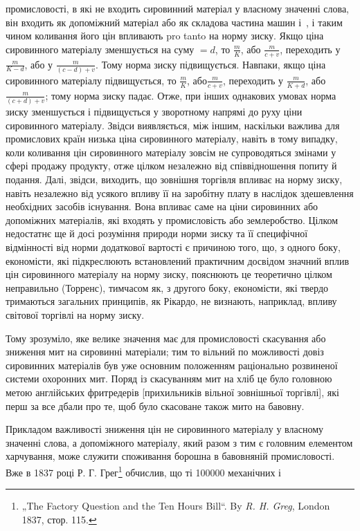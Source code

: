 \parcont{}  %
промисловості, в які не входить сировинний матеріал у власному значенні слова, він входить як
допоміжний матеріал або як складова частина машин і~, і таким чином коливання його цін
впливають pro tanto на норму зиску. Якщо ціна сировинного матеріалу зменшується на суму $= d$, то $\frac{m}{K}$,
або $\frac{m}{c + v}$, переходить у $\frac{m}{K - d}$, або у
$\frac{m}{(c - d) + v}$. Тому норма зиску підвищується. Навпаки, якщо ціна сировинного матеріалу
підвищується, то $\frac{m}{K}$, або$\frac{m}{c + v}$, переходить у $\frac{m}{K + d}$,
або $\frac{m}{(c + d) + v}$; тому норма зиску
падає. Отже, при інших однакових умовах норма
зиску зменшується і підвищується у зворотному напрямі до руху ціни сировинного матеріалу. Звідси
виявляється, між іншим, наскільки важлива для промислових країн низька ціна сировинного матеріалу,
навіть в тому випадку, коли коливання цін сировинного матеріалу зовсім не супроводяться змінами у
сфері продажу продукту, отже цілком незалежно від співвідношення попиту й подання. Далі, звідси,
виходить, що зовнішня торгівля впливає на норму зиску, навіть незалежно від усякого впливу її на
заробітну плату в наслідок здешевлення необхідних засобів існування. Вона впливає саме на ціни
сировинних або допоміжних матеріалів, які входять у промисловість або землеробство. Цілком
недостатнє ще й досі розуміння природи норми зиску та її специфічної відмінності від норми
додаткової вартості є причиною того, що, з одного боку, економісти, які підкреслюють встановлений
практичним досвідом значний вплив цін сировинного матеріалу на норму зиску, пояснюють це теоретично
цілком неправильно (Торренс), тимчасом як, з другого боку, економісти, які твердо тримаються
загальних принципів, як Рікардо, не визнають, наприклад, впливу світової торгівлі на норму зиску.

Тому зрозуміло, яке велике значення має для промисловості скасування або зниження мит на сировинні
матеріали; тим то вільний по можливості довіз сировинних матеріалів був уже основним положенням
раціонально розвиненої системи охоронних мит. Поряд із скасуванням мит на хліб це було головною
метою англійських фритредерів [прихильників вільної зовнішньої торгівлі], які перш за все дбали про
те, щоб було скасоване також мито на бавовну.

Прикладом важливості зниження цін не сировинного матеріалу у власному значенні слова, а допоміжного
матеріалу, який разом з тим є головним елементом харчування, може служити споживання борошна в
бавовняній промисловості. Вже в 1837 році Р. Г. Грег\footnote{
„The Factory Question and the Ten Hours Bill“. By \emph{R. H. Greg}, London 1837, стор. 115.
} обчислив, що ті \num{100000} механічних і
\parbreak{}  %
